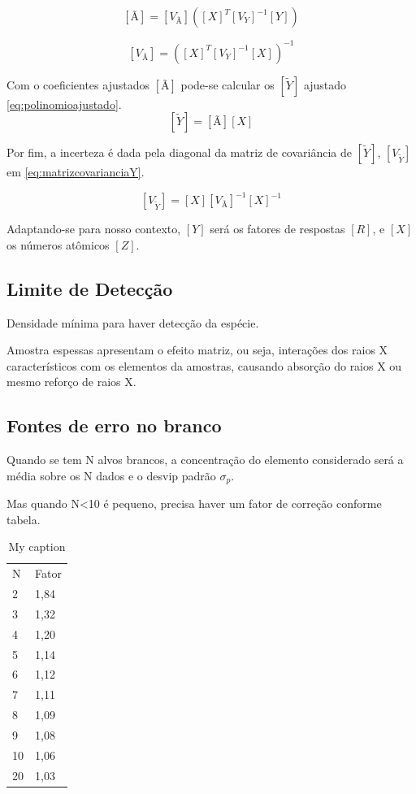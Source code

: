 \begin{equation}
  \label{eq:coeficientesajustados}
  [Ã] = [V_{Ã}] ([X]^T {[V_Y]}^{-1} [Y])
\end{equation}

\begin{equation}
  \label{eq:matrizcovariancia}
  [V_{Ã}] = ([X]^T [V_Y]^{-1} [X])^{-1}
\end{equation}

Com o coeficientes ajustados $[Ã]$ pode-se calcular os $[\tilde{Y}]$ ajustado \ref{eq:polinomioajustado}.
\begin{equation}
  \label{eq:polinomioajustado}
  [\tilde{Y}] = [Ã][X]
\end{equation}

Por fim, a incerteza é dada pela diagonal da matriz de covariância de $[\tilde{Y}]$, 
$[V_{\tilde{Y}}]$ em \ref{eq:matrizcovarianciaY}.

\begin{equation}
  \label{eq:matrizcovarianciaY}
  [V_{\tilde{Y}}] = [X] [V_{Ã}]^{-1} [X]^{-1}
\end{equation}

Adaptando-se para nosso contexto, $[Y]$ será os fatores de respostas $[R]$,
e $[X]$ os números atômicos $[Z]$.

\subsection{Limite de Detecção}

Densidade mínima para haver detecção da espécie. %

Amostra espessas apresentam o efeito matriz, ou seja, interações dos 
raios X característicos com os elementos da amostras, causando 
absorção do raios X ou mesmo reforço de raios X.

\subsection{Fontes de erro no branco}

Quando se tem N alvos brancos, a concentração do elemento 
considerado será a média sobre os N dados e o desvip padrão $\sigma_p$.

Mas quando N<10 é pequeno, precisa haver um fator de correção conforme tabela.

\begin{table}[H]
\centering
\caption{My caption}
\label{my-label}
\begin{tabular}{ll}
N  & Fator \\
2  & 1,84  \\
3  & 1,32  \\
4  & 1,20  \\
5  & 1,14  \\
6  & 1,12  \\
7  & 1,11  \\
8  & 1,09  \\
9  & 1,08  \\
10 & 1,06  \\
20 & 1,03 
\end{tabular}
\end{table}

